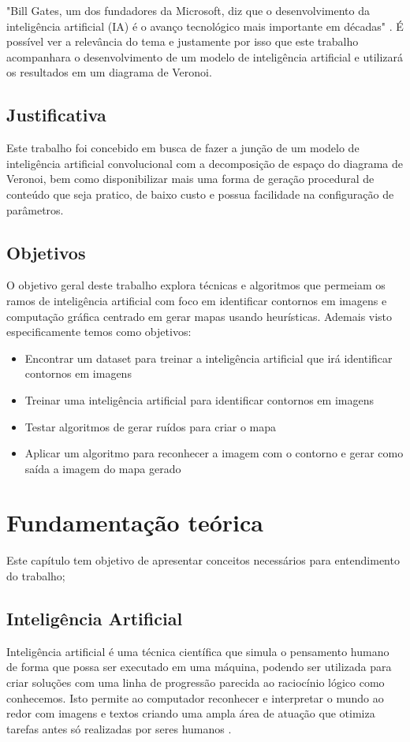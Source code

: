 \documentclass[
	12pt,				%
	openright,			%
	twoside,			%
	a4paper,			%
	english,			%
	french,				%
	spanish,			%
	brazil				%
	]{abntex2}
\begin{document}
"Bill Gates, um dos fundadores da Microsoft, diz que o desenvolvimento da inteligência artificial (IA) é o avanço tecnológico mais importante em décadas"\space
\cite{inteligencia_artificial_e_avanco_bbc}. É possível ver
a relevância do tema e justamente por isso que este trabalho acompanhara o desenvolvimento
de um modelo de inteligência artificial e utilizará os resultados em um diagrama de Veronoi.
\section{Justificativa}

Este trabalho foi concebido em busca de fazer a junção de um modelo de inteligência artificial convolucional com a decomposição de espaço do diagrama de Veronoi, bem como 
disponibilizar mais uma forma de geração procedural de conteúdo que seja pratico, de baixo custo e possua
facilidade na configuração de parâmetros.
\section{Objetivos}

O objetivo geral deste trabalho explora técnicas e algoritmos que permeiam os ramos de inteligência artificial com foco em identificar contornos em imagens e computação 
gráfica centrado em gerar mapas usando heurísticas.
Ademais visto especificamente temos como objetivos:

\begin{itemize}
	\item Encontrar um dataset para treinar a inteligência artificial que irá identificar contornos em imagens
	\item Treinar uma inteligência artificial para identificar contornos em imagens
	\item Testar algoritmos de gerar ruídos para criar o mapa
	\item Aplicar um algoritmo para reconhecer a imagem com o contorno e gerar como saída a imagem do mapa gerado
\end{itemize}


\chapter{Fundamentação teórica}
\label{sec:background}
	\label{sec:fund_teorica}

Este capítulo tem objetivo de apresentar conceitos necessários para entendimento do trabalho;

\section{Inteligência Artificial}
Inteligência artificial é uma técnica científica que simula o pensamento humano de forma que possa ser executado em uma máquina, podendo ser utilizada para criar soluções com uma linha de progressão parecida ao raciocínio lógico como conhecemos. Isto permite ao computador reconhecer e interpretar o mundo ao redor com imagens e textos criando uma ampla área de atuação que otimiza tarefas antes só realizadas por seres humanos \space\cite{ia_aliada_ou_inimiga}.
\end{document}
